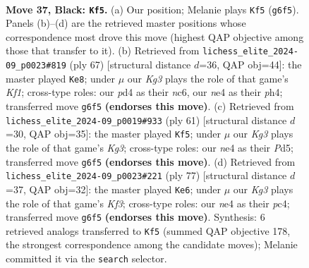 \documentclass[11pt]{article}
\begin{document}
\clearpage

\begin{figure}[p]\centering
\begin{subfigure}{0.46\textwidth}\centering
\resizebox{\linewidth}{!}{%
\newchessgame
\chessboard[
  setfen={7R/5pp1/4p1k1/1p5p/1r1PNP1P/4P1P1/8/6K1 b - - 0 37},
  showmover=false,
  pgfstyle=straightmove, color=movearrow, markmove={g6-f5}
]}
\caption{}
\end{subfigure}\hfill
\begin{subfigure}{0.46\textwidth}\centering
\resizebox{\linewidth}{!}{%
\newchessgame
\chessboard[
  setfen={5k2/2R2pp1/2N1p1p1/4P3/5P1P/1p1K2P1/8/2r5 b - - 8 34},
  showmover=false,
  pgfstyle=straightmove, color=movearrow, markmove={f8-e8}
]}
\caption{}
\end{subfigure}
\\[4pt]
\begin{subfigure}{0.46\textwidth}\centering
\resizebox{\linewidth}{!}{%
\newchessgame
\chessboard[
  setfen={8/R5p1/4ppk1/P2p3p/3P3P/4PP2/r5P1/6K1 b - - 0 31},
  showmover=false,
  pgfstyle=straightmove, color=movearrow, markmove={g6-f5}
]}
\caption{}
\end{subfigure}\hfill
\begin{subfigure}{0.46\textwidth}\centering
\resizebox{\linewidth}{!}{%
\newchessgame
\chessboard[
  setfen={8/3r1p2/3P1kpp/p2Rp3/1pP3P1/1P5P/5PK1/8 b - - 0 39},
  showmover=false,
  pgfstyle=straightmove, color=movearrow, markmove={f6-e6}
]}
\caption{}
\end{subfigure}
\caption{\textbf{Move 37, Black: \texttt{Kf5}.} (a) Our position; Melanie plays \texttt{Kf5} (\texttt{g6f5}). Panels (b)--(d) are the retrieved master positions whose correspondence most drove this move (highest QAP objective among those that transfer to it). (b) Retrieved from \texttt{lichess\_elite\_2024-09\_p0023\#819} (ply 67) [structural distance $d$=36, QAP obj=44]: the master played \texttt{Ke8}; under $\mu$ our \emph{Kg3} plays the role of that game's \emph{Kf1}; cross-type roles: our \emph{p}d4 as their \emph{n}c6, our \emph{n}e4 as their \emph{p}h4; transferred move \texttt{g6f5} \textbf{(endorses this move)}. (c) Retrieved from \texttt{lichess\_elite\_2024-09\_p0019\#933} (ply 61) [structural distance $d$=30, QAP obj=35]: the master played \texttt{Kf5}; under $\mu$ our \emph{Kg3} plays the role of that game's \emph{Kg3}; cross-type roles: our \emph{n}e4 as their \emph{P}d5; transferred move \texttt{g6f5} \textbf{(endorses this move)}. (d) Retrieved from \texttt{lichess\_elite\_2024-09\_p0023\#221} (ply 77) [structural distance $d$=37, QAP obj=32]: the master played \texttt{Ke6}; under $\mu$ our \emph{Kg3} plays the role of that game's \emph{Kf3}; cross-type roles: our \emph{n}e4 as their \emph{p}c4; transferred move \texttt{g6f5} \textbf{(endorses this move)}. Synthesis: 6 retrieved analogs transferred to \texttt{Kf5} (summed QAP objective 178, the strongest correspondence among the candidate moves); Melanie committed it via the \texttt{search} selector.}
\label{fig:thought-m73}
\end{figure}
\end{document}
